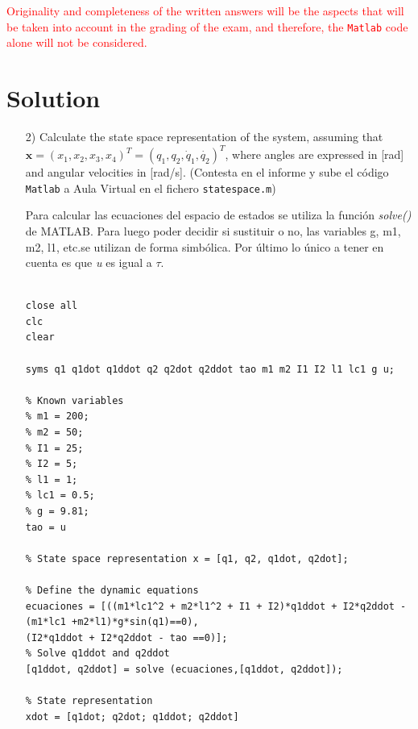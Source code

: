 \documentclass{article}
\begin{document}
\bigskip

\noindent
\textcolor{red}{
Originality and completeness of the written answers will be the aspects that will be taken into account in the grading of the exam, and therefore, the \texttt{Matlab} code alone will not be considered. 
} 


\newpage

\section*{Solution}


\begin{itemize}

\item[2)] {\color{gray}  Calculate the state space representation of the system, assuming that $\mathbf{x}  = ( x_1, x_2, x_3, x_4)^T = (q_1, q_2, \dot{q}_1, \dot{q_2})^T$, where angles are expressed in [rad] and angular velocities in [rad/s]. (Contesta en el informe y sube el c\'odigo \texttt{Matlab} a Aula Virtual en el fichero \texttt{statespace.m})}

\bigskip

Para calcular las ecuaciones del espacio de estados se utiliza la función \textit{solve()} de MATLAB. Para luego poder decidir si sustituir o no, las variables g, m1, m2, l1, etc.se utilizan de forma simbólica. Por último lo único a tener en cuenta es que \textit{u} es igual a $\tau$.

\bigskip

\begin{tcolorbox}[width=12cm, title={File \texttt{statespace.m}}]
\begin{scriptsize}
\begin{verbatim}

close all
clc
clear

syms q1 q1dot q1ddot q2 q2dot q2ddot tao m1 m2 I1 I2 l1 lc1 g u;

% Known variables
% m1 = 200;
% m2 = 50;
% I1 = 25;
% I2 = 5;
% l1 = 1;
% lc1 = 0.5;
% g = 9.81;
tao = u

% State space representation x = [q1, q2, q1dot, q2dot];

% Define the dynamic equations
ecuaciones = [((m1*lc1^2 + m2*l1^2 + I1 + I2)*q1ddot + I2*q2ddot -(m1*lc1 +m2*l1)*g*sin(q1)==0),
(I2*q1ddot + I2*q2ddot - tao ==0)];
% Solve q1ddot and q2ddot
[q1ddot, q2ddot] = solve (ecuaciones,[q1ddot, q2ddot]);

% State representation
xdot = [q1dot; q2dot; q1ddot; q2ddot]


\end{verbatim}
\end{scriptsize}
\end{tcolorbox}
\end{itemize}
\end{document}
